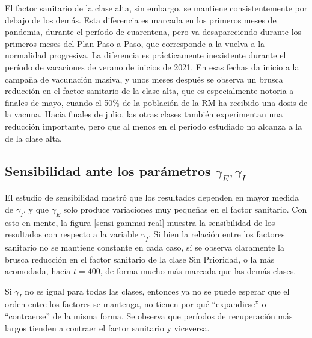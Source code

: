 El factor sanitario de la clase alta, sin embargo, se mantiene consistentemente por debajo de los demás. Esta diferencia es marcada en los primeros meses de pandemia, durante el período de cuarentena, pero va desapareciendo durante los primeros meses del Plan Paso a Paso, que corresponde a la vuelva a la normalidad progresiva. La diferencia es prácticamente inexistente durante el período de vacaciones de verano de inicios de 2021. En esas fechas da inicio a la campaña de vacunación masiva, y unos meses después se observa un brusca reducción en el factor sanitario de la clase alta, que es especialmente notoria a finales de mayo, cuando el 50\% de la población de la RM ha recibido una dosis de la vacuna. Hacia finales de julio, las otras clases también experimentan una reducción importante, pero que al menos en el período estudiado no alcanza a la de la clase alta.


\subsection{Sensibilidad ante los parámetros \(\gamma_E, \gamma_I\)} \label{subsec:sensigamma}

El estudio de sensibilidad mostró que los resultados dependen en mayor medida de \(\gamma_I\), y que \(\gamma_E\) solo produce variaciones muy pequeñas en el factor sanitario. Con esto en mente, la figura \ref{sensi-gammai-real} muestra la sensibilidad de los resultados con respecto a la variable \(\gamma_I\). Si bien la relación entre los factores sanitario no se mantiene constante en cada caso, sí se observa claramente la brusca reducción en el factor sanitario de la clase Sin Prioridad, o la más acomodada, hacia \(t = 400\), de forma mucho más marcada que las demás clases.

Si \(\gamma_I\) no es igual para todas las clases, entonces ya no se puede esperar que el orden entre los factores se mantenga, no tienen por qué ``expandirse'' o ``contraerse'' de la misma forma. Se observa que períodos de recuperación más largos tienden a contraer el factor sanitario y viceversa.

